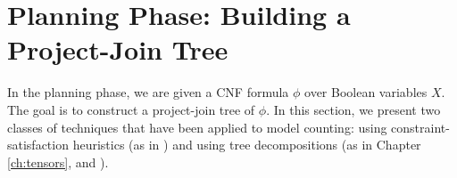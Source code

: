 \section{Planning Phase: Building a Project-Join Tree}
\label{sec_planning}

In the planning phase, we are given a CNF formula $\phi$ over Boolean variables $X$.
The goal is to construct a project-join tree of $\phi$.
In this section, we present two classes of techniques that have been applied to model counting:
using constraint-satisfaction heuristics (as in \cite{DPV20}) and using tree decompositions (as in Chapter \ref{ch:tensors}, and \cite{CW16,FHMW17,FHWZ18,FHZ19,fichte2020exploiting}).







